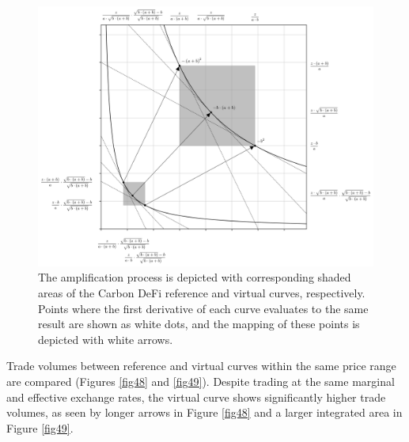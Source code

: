 \documentclass{article}
\begin{document}
\begin{figure}[ht]
    \centering
    \includegraphics[width=\textwidth]{fig47.png}
    \captionsetup{
        justification=raggedright,
        singlelinecheck=false,
        font=small,
        labelfont=bf,
        labelsep=quad,
        format=plain
    }
    \caption{The amplification process is depicted with corresponding shaded areas of the Carbon DeFi reference and virtual curves, respectively. Points where the first derivative of each curve evaluates to the same result are shown as white dots, and the mapping of these points is depicted with white arrows.}
    \label{fig47}
\end{figure}

Trade volumes between reference and virtual curves within the same price range are compared (Figures \ref{fig48} and \ref{fig49}). Despite trading at the same marginal and effective exchange rates, the virtual curve shows significantly higher trade volumes, as seen by longer arrows in Figure \ref{fig48} and a larger integrated area in Figure \ref{fig49}.
\end{document}
